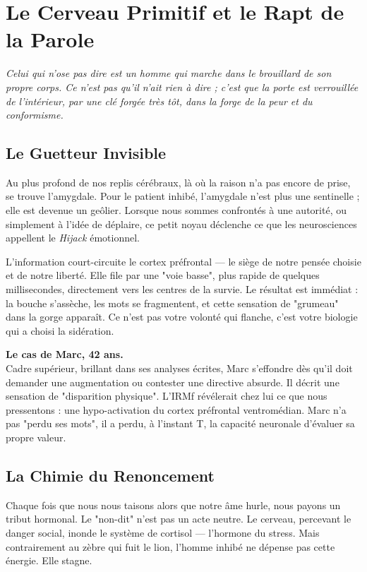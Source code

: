 \documentclass[11.5pt,a4paper]{book}
\begin{document}
\chapter{Le Cerveau Primitif et le Rapt de la Parole}

\textit{Celui qui n'ose pas dire est un homme qui marche dans le brouillard de son propre corps. Ce n'est pas qu'il n'ait rien à dire ; c'est que la porte est verrouillée de l'intérieur, par une clé forgée très tôt, dans la forge de la peur et du conformisme.}

\section{Le Guetteur Invisible}
Au plus profond de nos replis cérébraux, là où la raison n'a pas encore de prise, se trouve l'amygdale. Pour le patient inhibé, l'amygdale n'est plus une sentinelle ; elle est devenue un geôlier. Lorsque nous sommes confrontés à une autorité, ou simplement à l'idée de déplaire, ce petit noyau déclenche ce que les neurosciences appellent le \textit{Hijack} émotionnel. 

L'information court-circuite le cortex préfrontal — le siège de notre pensée choisie et de notre liberté. Elle file par une "voie basse", plus rapide de quelques millisecondes, directement vers les centres de la survie. Le résultat est immédiat : la bouche s'assèche, les mots se fragmentent, et cette sensation de "grumeau" dans la gorge apparaît. Ce n'est pas votre volonté qui flanche, c'est votre biologie qui a choisi la sidération.

\begin{NoteClinique}
\textbf{Le cas de Marc, 42 ans.} \\
Cadre supérieur, brillant dans ses analyses écrites, Marc s'effondre dès qu'il doit demander une augmentation ou contester une directive absurde. Il décrit une sensation de "disparition physique". L'IRMf révélerait chez lui ce que nous pressentons : une hypo-activation du cortex préfrontal ventromédian. Marc n'a pas "perdu ses mots", il a perdu, à l'instant T, la capacité neuronale d'évaluer sa propre valeur.
\end{NoteClinique}

\section{La Chimie du Renoncement}
Chaque fois que nous nous taisons alors que notre âme hurle, nous payons un tribut hormonal. Le "non-dit" n'est pas un acte neutre. Le cerveau, percevant le danger social, inonde le système de cortisol — l'hormone du stress. Mais contrairement au zèbre qui fuit le lion, l'homme inhibé ne dépense pas cette énergie. Elle stagne.
\end{document}
